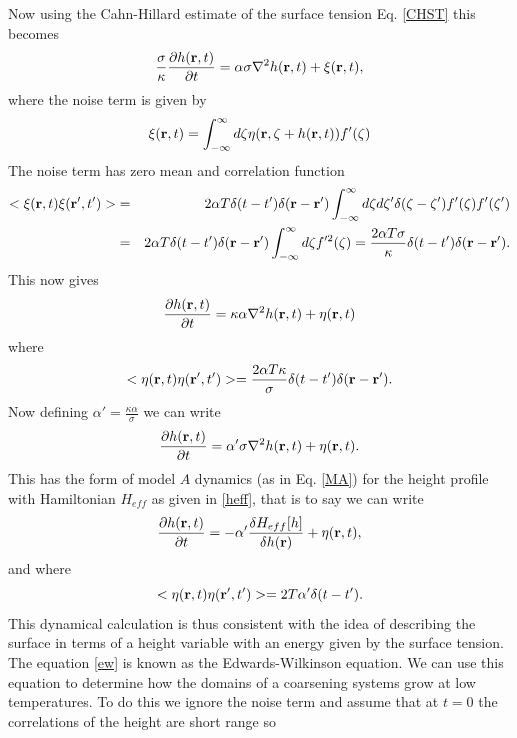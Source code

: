 Now using the Cahn-Hillard estimate of the surface tension Eq. \eqref{CHST} this becomes
\begin{equation}
    \frac{\sigma}{\kappa} \frac{\partial h({\bf r},t)}{\partial t}
    = \alpha\sigma \nabla^2 h({\bf r},t) +\xi({\bf r},t),
\end{equation}
where the noise term is given by
\begin{equation}
    \xi({\bf r},t)= \int_{-\infty}^\infty d\zeta \eta({\bf r},\zeta+ h({\bf r},t))f'(\zeta)
\end{equation}
The noise term has zero mean and correlation function
\begin{eqnarray}
< \xi({\bf r},t)\xi({\bf r}',t')> &=&2\alpha T\delta(t-t')\delta({\bf r}-{\bf r}')\int_{-\infty}^\infty d\zeta d\zeta' \delta(\zeta-\zeta')f'(\zeta)f'(\zeta')\\
&=& 2\alpha T\delta(t-t')\delta({\bf r}-{\bf r}')\int_{-\infty}^\infty d\zeta f'^2(\zeta)= \frac{2\alpha T\sigma}{\kappa}\delta(t-t')\delta({\bf r}-{\bf r}').
\end{eqnarray}
This now gives
\begin{equation}
    \frac{\partial h({\bf r},t)}{\partial t}= \kappa\alpha \nabla^2 h({\bf r},t) + \eta({\bf r},t)
\end{equation}
where 
\begin{equation}
    < \eta({\bf r},t)\eta({\bf r}',t')> = \frac{2\alpha T\kappa}{\sigma}\delta(t-t')\delta({\bf r}-{\bf r}').
\end{equation}
Now defining $\alpha' = \frac{\kappa\alpha}{\sigma}$ we can write
\begin{equation}
    \frac{\partial h({\bf r},t)}{\partial t}= \alpha' \sigma\nabla^2 h({\bf r},t) + \eta({\bf r},t).
\end{equation}
This has the form of model $A$ dynamics (as in Eq. \eqref{MA})  for the height profile with Hamiltonian
$H_{eff}$ as given in \eqref{heff}, that is to say we can write
\begin{equation}
    \frac{\partial h({\bf r},t)}{\partial t}= -\alpha' \frac{\delta H_{eff}[h]}{\delta h({\bf r})} + \eta({\bf r},t),
    \label{ew}
\end{equation}
and where 
\begin{equation}
    < \eta({\bf r},t)\eta({\bf r}',t')>= 2T\alpha'\delta(t-t').
\end{equation}
This dynamical calculation is thus consistent with the idea of describing the surface in terms of a height variable with an energy given by the surface tension. The equation \eqref{ew} is known as the Edwards-Wilkinson equation. We can use this equation to determine how the domains of a coarsening systems grow at low temperatures. To do this we ignore the noise term and assume that at $t=0$ the correlations of the height are short range so
